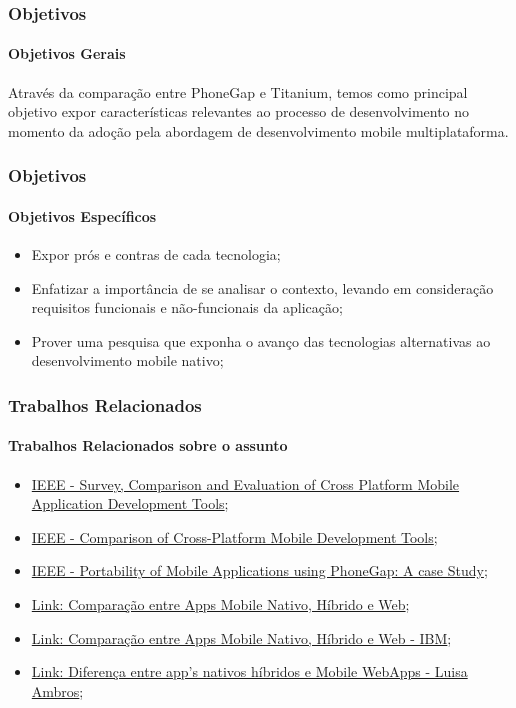 \documentclass[10pt]{beamer}
\begin{document}
\begin{frame}
	\frametitle{Objetivos}
	\framesubtitle{Objetivos Gerais}
	Através da comparação entre PhoneGap e Titanium, temos como principal objetivo expor características relevantes ao processo de desenvolvimento no momento da adoção pela abordagem de desenvolvimento mobile multiplataforma.
\end{frame}

\begin{frame}
	\frametitle{Objetivos}
	\framesubtitle{Objetivos Específicos}
	\begin{itemize}
		\item Expor prós e contras de cada tecnologia;
		\item Enfatizar a importância de se analisar o contexto, levando em consideração requisitos funcionais e não-funcionais da aplicação;
		\item Prover uma pesquisa que exponha o avanço das tecnologias alternativas ao desenvolvimento mobile nativo;
	\end{itemize}
\end{frame}

\begin{frame}
	\frametitle{Trabalhos Relacionados}
	\framesubtitle{Trabalhos Relacionados sobre o assunto}
	\begin{itemize}
			\item \href{http://ieeexplore.ieee.org/stamp/stamp.jsp?arnumber=6583580} {IEEE - Survey, Comparison and Evaluation of Cross Platform Mobile Application Development Tools};		
			\item \href{http://ieeexplore.ieee.org/stamp/stamp.jsp?arnumber=6376023}{IEEE - Comparison of Cross-Platform Mobile Development Tools};
			\item \href{http://ieeexplore.ieee.org/stamp/stamp.jsp?arnumber=6549324}{IEEE - Portability of Mobile Applications using PhoneGap: A case Study};
			\item \href{http://www.nngroup.com/articles/mobile-native-apps/}{Link: Comparação entre Apps Mobile Nativo, Híbrido e Web};
			\item \href{https://www.ibm.com/developerworks/community/blogs/ctaurion/entry/desenvolvimento_de_apps-parte_2_hibrido_nativo_ou_web?lang=en}{Link: Comparação entre Apps Mobile Nativo, Híbrido e Web - IBM};
			\item \href{http://luisaambros.com/blog/diferenca-entre-aplicativos-nativos-hibridos-e-mobile-web-apps/}{Link: Diferença entre app's nativos híbridos e Mobile WebApps - Luisa Ambros}; 
	\end{itemize}	
\end{frame}
\end{document}
